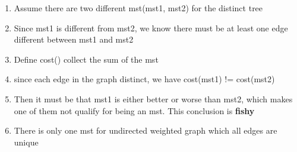 \documentclass{article}
\begin{document}
\begin{enumerate}
    \item Assume there are two different mst(mst1, mst2) for the distinct tree
    \item Since mst1 is different from mst2, we know there must be at least one edge different between mst1 and mst2
    \item Define cost() collect the sum of the mst
    \item since each edge in the graph distinct, we have cost(mst1) != cost(mst2)
    \item Then it must be that mst1 is either better or worse than mst2, which makes one of them not qualify for being an mst. This conclusion is \textbf{fishy}
    \item There is only one mst for undirected weighted graph which all edges are unique 
\end{enumerate}
\end{document}
